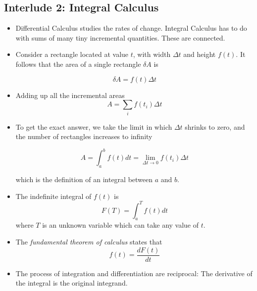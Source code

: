 \documentclass[../main.tex]{subfiles}
\begin{document}
\subsection{Interlude 2: Integral Calculus}
\begin{itemize}

    \item Differential Calculus studies the rates of change. Integral Calculus
        has to do with sums of many tiny incremental quantities. These are
        connected.
        
    \item Consider a rectangle located at value $t$, with width $\Delta t$ and
        height $f(t)$. It follows that the area of a single rectangle $\delta
        A$ is

        \begin{equation}
            \delta A = f(t)\Delta t
        \end{equation}

    \item Adding up all the incremental areas
        \begin{equation}
            A = \sum_i f(t_i)\Delta t
        \end{equation}

    \item To get the exact answer, we take the limit in which $\Delta t$
        shrinks to zero, and the number of rectangles increases to infinity

        \begin{equation}
            A = \int_a^b f(t) dt = \lim_{\Delta t \rightarrow 0} f(t_i)\Delta t
        \end{equation}

        which is the definition of an integral between $a$ and $b$.

    \item The indefinite integral of $f(t)$ is
        \begin{equation}
            F(T) = \int_a^T f(t) dt
        \end{equation}
        where $T$ is an unknown variable which can take any value of $t$. 

    \item The \textit{fundamental theorem of calculus} states that
        \begin{equation}
            f(t) = \frac{dF(t)}{dt}
        \end{equation}

    \item The process of integration and differentiation are reciprocal: The
        derivative of the integral is the original integrand.


\end{itemize}
\end{document}
